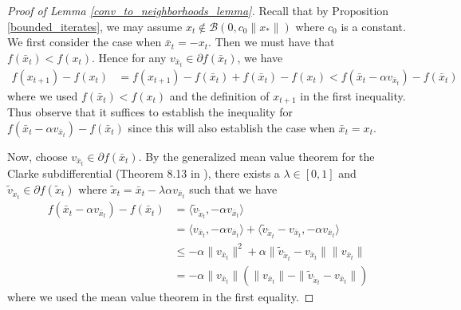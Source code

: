 \documentclass[11pt]{article}
\newcommand{\al}{\alpha}
\theoremstyle{remark}
\begin{document}
\begin{proof}[Proof of Lemma \ref{conv_to_neighborhoods_lemma}]
Recall that by Proposition \ref{bounded_iterates}, we may assume $x_t \notin \mathcal{B}(0,c_0\|x_*\|)$ where $c_0$ is a constant. We first consider the case when $\bar{x}_t = -x_t$. Then we must have that $f(\bar{x}_t) < f(x_t)$. Hence for any $v_{\bar{x}_t} \in \partial f(\bar{x}_t)$, we have \begin{align*}
    f(x_{t+1}) - f(x_t) & = f(x_{t+1}) - f(\bar{x}_t) + f(\bar{x}_t) - f(x_t) < f(\bar{x}_t - \al v_{\bar{x}_t}) - f(\bar{x}_t)
\end{align*} where we used $f(\bar{x}_t) < f(x_t)$ and the definition of $x_{t+1}$ in the first inequality. Thus observe that it suffices to establish the inequality for $f(\bar{x}_t - \al v_{\bar{x}_t}) - f(\bar{x}_t)$ since this will also establish the case when $\bar{x}_t = x_t$.

Now, choose $v_{\bar{x}_t} \in \partial f(\bar{x}_t)$. By the generalized mean value theorem for the Clarke subdifferential (Theorem 8.13 in \cite{Clason2017}), there exists a $\lambda \in [0,1]$ and $\tilde{v}_{\tilde{x}_t} \in \partial f(\tilde{x}_t)$ where $\tilde{x}_t = \bar{x}_t - \lambda \al v_{\bar{x}_t}$ such that we have \begin{align*}
     f(\bar{x}_{t} - \alpha v_{\bar{x}_t}) - f(\bar{x}_t) 
    & = \langle \tilde{v}_{\tilde{x}_t}, -\al v_{\bar{x}_t}\rangle \nonumber \nonumber\\
    & = \langle v_{\bar{x}_t},-\al v_{\bar{x}_t} \rangle + \langle \tilde{v}_{\tilde{x}_t}-v_{\bar{x}_t},-\al v_{\bar{x}_t} \rangle \nonumber\\
    & \leqslant -\al\|v_{\bar{x}_t}\|^2 + \al\|\tilde{v}_{\tilde{x}_t} - v_{\bar{x}_t}\|\|v_{\bar{x}_t}\| \\
    & = - \al \|v_{\bar{x}_t}\|\left(\|v_{\bar{x}_t}\| - \|\tilde{v}_{\tilde{x}_t} - v_{\bar{x}_t}\|\right)
\end{align*} where we used the mean value theorem in the first equality.


\end{proof}
\end{document}
